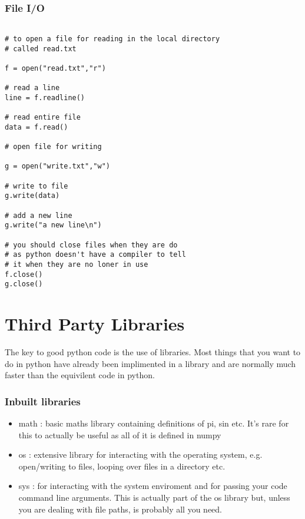 \documentclass[11pt,a4paper]{article}
\begin{document}
\subsubsection{File I/O}
\begin{verbatim}

# to open a file for reading in the local directory
# called read.txt

f = open("read.txt","r")

# read a line
line = f.readline()

# read entire file
data = f.read()

# open file for writing

g = open("write.txt","w")

# write to file
g.write(data)

# add a new line
g.write("a new line\n")

# you should close files when they are do
# as python doesn't have a compiler to tell
# it when they are no loner in use
f.close()
g.close()

\end{verbatim}



\section{Third Party Libraries}

The key to good python code is the use of libraries. Most things that you want to do in python have already been implimented in a library and are normally much faster than the equivilent code in python.

\subsubsection{Inbuilt libraries}
\begin{itemize}
\item math : basic maths library containing definitions of pi, sin etc. It's rare for this to actually be useful as all of it is defined in numpy
\item os : extensive library for interacting with the operating system, e.g. open/writing to files, looping over files in a directory etc.
\item sys : for interacting with the system enviroment and for passing your code command line arguments. This is actually part of the os library but, unless you are dealing with file paths, is probably all you need.
\end{itemize}
\end{document}
